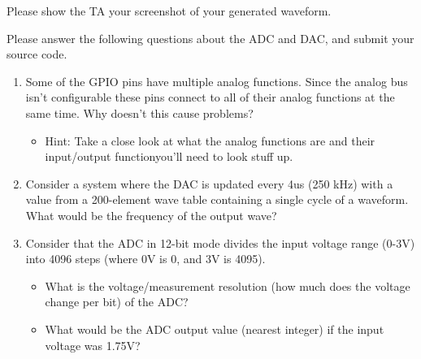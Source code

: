 \documentclass[openany,11pt,fleqn]{book} %
\begin{document}
\begin{assignment}
	Please show the TA your screenshot of your generated waveform.
\end{assignment}

\begin{question}[Postlab 6]
	Please answer the following questions about the ADC and DAC, and submit your source code.
	\begin{enumerate}
		\item Some of the GPIO pins have multiple analog functions. Since the analog bus isn't configurable these pins connect to all of their analog functions at the same time. Why doesn't this cause problems?
		\begin{itemize}
			\item Hint: Take a close look at what the analog functions are and their input/output function\textemdash you'll need to look stuff up.
		\end{itemize}
		\item Consider a system where the DAC is updated every 4us (250 kHz) with a value from a 200-element wave table containing a single cycle of a waveform. What would be the frequency of the output wave? 
		\item Consider that the ADC in 12-bit mode divides the input voltage range (0-3V) into 4096 steps (where 0V is 0, and 3V is 4095).
		\begin{itemize}
			\item What is the voltage/measurement resolution (how much does the voltage change per bit) of the ADC?
			\item What would be the ADC output value (nearest integer) if the input voltage was 1.75V?
		\end{itemize}
	\end{enumerate}
\end{question}
\end{document}
